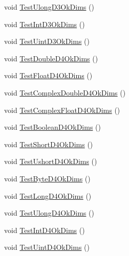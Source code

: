 \begin{DoxyCompactItemize}
\item 
void \mbox{\hyperlink{classkhiva_1_1array_1_1tests_1_1_array_tests_a328dadce78810fc2b869bd2f9be821db}{Test\+Ulong\+D3\+Ok\+Dims}} ()
\item 
void \mbox{\hyperlink{classkhiva_1_1array_1_1tests_1_1_array_tests_a8b385f4ab896ae2c11f54548b4f25e76}{Test\+Int\+D3\+Ok\+Dims}} ()
\item 
void \mbox{\hyperlink{classkhiva_1_1array_1_1tests_1_1_array_tests_a757cbacf81843125cb7dadb9ea966356}{Test\+Uint\+D3\+Ok\+Dims}} ()
\item 
void \mbox{\hyperlink{classkhiva_1_1array_1_1tests_1_1_array_tests_ad348e608e3511014b546e58335fc6968}{Test\+Double\+D4\+Ok\+Dims}} ()
\item 
void \mbox{\hyperlink{classkhiva_1_1array_1_1tests_1_1_array_tests_ae6aa09bfbcfbb7d6859303c11ae672a5}{Test\+Float\+D4\+Ok\+Dims}} ()
\item 
void \mbox{\hyperlink{classkhiva_1_1array_1_1tests_1_1_array_tests_a7a1f6c52384a2be93d4c93d56f34ed2e}{Test\+Complex\+Double\+D4\+Ok\+Dims}} ()
\item 
void \mbox{\hyperlink{classkhiva_1_1array_1_1tests_1_1_array_tests_aca7c2568dddc16be0855cf0b83c5d3b7}{Test\+Complex\+Float\+D4\+Ok\+Dims}} ()
\item 
void \mbox{\hyperlink{classkhiva_1_1array_1_1tests_1_1_array_tests_a911031f42700d7f13c2ce893af49dfc1}{Test\+Boolean\+D4\+Ok\+Dims}} ()
\item 
void \mbox{\hyperlink{classkhiva_1_1array_1_1tests_1_1_array_tests_a285abd537318b8138e9822e67b9f96c0}{Test\+Short\+D4\+Ok\+Dims}} ()
\item 
void \mbox{\hyperlink{classkhiva_1_1array_1_1tests_1_1_array_tests_a73b485e99b692dff2990f3b38754956d}{Test\+Ushort\+D4\+Ok\+Dims}} ()
\item 
void \mbox{\hyperlink{classkhiva_1_1array_1_1tests_1_1_array_tests_a3d299369d1a24aa7853b9df46f53b2c4}{Test\+Byte\+D4\+Ok\+Dims}} ()
\item 
void \mbox{\hyperlink{classkhiva_1_1array_1_1tests_1_1_array_tests_a20fdc8ca67fbb763ad35bf47235daefb}{Test\+Long\+D4\+Ok\+Dims}} ()
\item 
void \mbox{\hyperlink{classkhiva_1_1array_1_1tests_1_1_array_tests_a96385d796677939e48a73aebc9391a71}{Test\+Ulong\+D4\+Ok\+Dims}} ()
\item 
void \mbox{\hyperlink{classkhiva_1_1array_1_1tests_1_1_array_tests_a6fba7dfd9acd1d52ee1f5622c0222955}{Test\+Int\+D4\+Ok\+Dims}} ()
\item 
void \mbox{\hyperlink{classkhiva_1_1array_1_1tests_1_1_array_tests_a193a858cda514c64e892a7cc6b4eb00b}{Test\+Uint\+D4\+Ok\+Dims}} ()

\end{DoxyCompactItemize}
